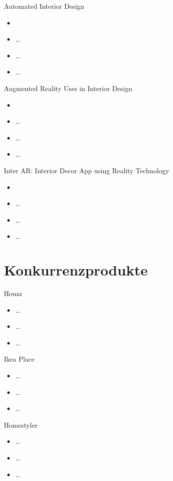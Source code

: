 \documentclass[presentation,bigger,aspectratio=169]{beamer}
\begin{document}
\begin{frame}[label={sec:org9b507a3}]{Automated Interior Design}
\begin{itemize}
\item \textcite{kanAutomatedInteriorDesign2017}
\item \ldots{}
\item \ldots{}
\item \ldots{}
\end{itemize}
\end{frame}

\begin{frame}[label={sec:org7e63ba0}]{Augmented Reality Uses in Interior Design}
\begin{itemize}
\item \textcite{sanduAugmentedRealityUses2018}
\item \ldots{}
\item \ldots{}
\item \ldots{}
\end{itemize}
\end{frame}

\begin{frame}[label={sec:orga08e232}]{Inter AR: Interior Decor App using Reality Technology}
\begin{itemize}
\item \textcite{moaresInterARInterior2020}
\item \ldots{}
\item \ldots{}
\item \ldots{}
\end{itemize}
\end{frame}
\section{Konkurrenzprodukte}
\label{sec:org2b8c720}
\begin{frame}[label={sec:org75bb593}]{\MakeUppercase{\insertsection}}
\end{frame}
\begin{frame}[label={sec:orgf58d8b4}]{Houzz}
\begin{itemize}
\item \ldots{}
\item \ldots{}
\item \ldots{}
\end{itemize}
\end{frame}
\begin{frame}[label={sec:org4f49df5}]{Ikea Place}
\begin{itemize}
\item \ldots{}
\item \ldots{}
\item \ldots{}
\end{itemize}
\end{frame}
\begin{frame}[label={sec:org896113f}]{Homestyler}
\begin{itemize}
\item \ldots{}
\item \ldots{}
\item \ldots{}
\end{itemize}
\end{frame}
\end{document}

